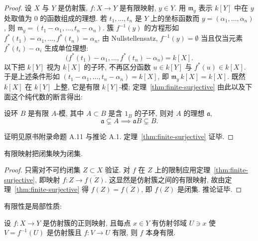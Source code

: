 \begin{proof}
	设 $X$ 与 $Y$ 是仿射簇, $f: X \to Y$ 是有限映射, $y \in Y$. 用 $\mathfrak m_y$ 表示 $k[Y]$ 中在 $y$ 处取值为 $0$ 的函数组成的理想. 若 $t_1, \ldots, t_n$ 是 $Y$ 上的坐标函数而 $y = (\alpha_1, \ldots, \alpha_n)$, 则 $\mathfrak m_y = (t_1 - \alpha_1, \ldots, t_n - \alpha_n)$. 簇 $f^{-1}(y)$ 的方程形如 $f^*(t_1) = \alpha_1, \ldots, f^*(t_n) = \alpha_n$, 由 Nullstellensatz, $f^{-1}(y) = \emptyset$ 当且仅当元素 $f^*(t_i) - \alpha_i$ 生成单位理想:
	\[
		\bigl( f^*(t_1) - \alpha_1, \ldots, f^*(t_n) - \alpha_n \bigr) = k[X].
	\]
	以下把 $k[Y]$ 视为 $k[X]$ 的子环, 不再区分函数 $u \in k[Y]$ 与 $f^*(u) \in k[X]$. 于是上述条件形如 $(t_1 - \alpha_1, \ldots, t_n - \alpha_n) = k[X]$, 即 $\mathfrak m_y\, k[X] = k[X]$. 既然 $k[X]$ 在 $k[Y]$ 上整, 它是有限 $k[Y]$-模; 定理~\ref{thm:finite-surjective} 由此以及下面这个纯代数的断言得出:

	\begin{lemma}\label{lem:module-lemma}
		设环 $B$ 是有限 $A$-模, 其中 $A \subset B$ 是含 $1_B$ 的子环, 则对 $A$ 的理想 $\mathfrak a$,
		\[
			\mathfrak a \subsetneq A \implies \mathfrak a B \subsetneq B.
		\]
	\end{lemma}
	证明见原书附录命题 A.11 与推论 A.1. 定理~\ref{thm:finite-surjective} 证毕.
\end{proof}

\begin{corollary}\label{cor:finite-closed}
	有限映射把闭集映为闭集.
\end{corollary}

\begin{proof}
	只需对不可约闭集 $Z \subset X$ 验证. 对 $f$ 在 $Z$ 上的限制应用定理~\ref{thm:finite-surjective}, 即映射 $f: Z \to \overline{f(Z)}$. 这显然是仿射簇之间的有限映射, 故由定理~\ref{thm:finite-surjective} 得 $f(Z) = \overline{f(Z)}$, 即 $f(Z)$ 是闭集. 推论证毕.
\end{proof}

有限性是局部性质:

\begin{theorem}\label{thm:finiteness-local}
	设 $f: X \to Y$ 是仿射簇的正则映射, 且每点 $x \in Y$ 有仿射邻域 $U \ni x$ 使 $V = f^{-1}(U)$ 是仿射簇且 $f: V \to U$ 有限, 则 $f$ 本身有限.
\end{theorem}


